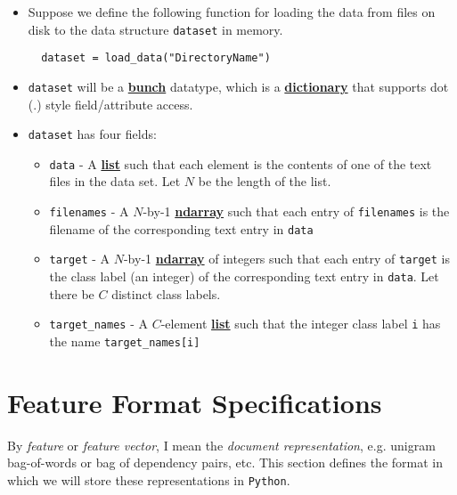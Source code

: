 \documentclass[12pt]{article}
\newcommand{\bt}[1]{\textbf{#1}}
\begin{document}
  \begin{itemize} 
  \item Suppose we define the following function for loading the data from files on disk to the data structure {\tt dataset} in memory.
  
  \begin{lstlisting}
  dataset = load_data("DirectoryName")
  \end{lstlisting}
  \item {\tt dataset} will be a \href{https://pypi.python.org/pypi/bunch/1.0.1}{\bt{bunch}} datatype, which is a \href{http://docs.python.org/2/library/stdtypes.html#dict}{\bt{dictionary}} that supports dot (.) style field/attribute access.
  \item {\tt dataset} has four fields:
  \begin{itemize}
  	\item {\tt data} - A \href{http://docs.python.org/2/library/stdtypes.html#typesseq}{\bt{list}} such that each element is the contents of one of the text files in the data set. Let $N$ be the length of the list. 
	\item {\tt filenames} - A $N$-by-1 \href{http://docs.scipy.org/doc/numpy/reference/arrays.ndarray.html}{\bt{ndarray}} such that each entry of {\tt filenames} is the filename of the corresponding text entry in {\tt data}
	\item {\tt target} - A $N$-by-1 \href{http://docs.scipy.org/doc/numpy/reference/arrays.ndarray.html}{\bt{ndarray}} of integers such that each entry of {\tt target} is the class label (an integer) of the corresponding text entry in {\tt data}. Let there be $C$ distinct class labels.
	\item {\tt target\_names} - A $C$-element \href{http://docs.python.org/2/library/stdtypes.html#typesseq}{\bt{list}} such that the integer class label {\tt i} has the name {\tt target\_names[i]}
  \end{itemize}
  \end{itemize}
  
  
\section{Feature Format Specifications}

By \emph{feature} or \emph{feature vector}, I mean the \emph{document representation}, e.g. unigram bag-of-words or bag of dependency pairs, etc. This section defines the format in which we will store these representations in {\tt Python}.
\end{document}
